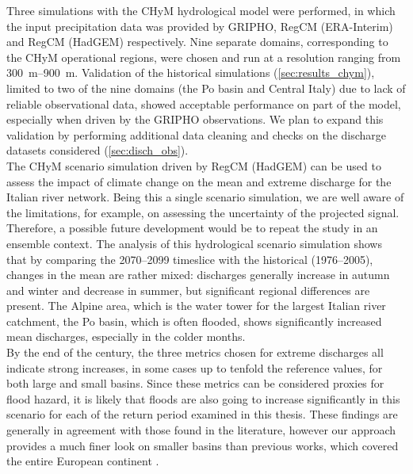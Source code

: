 Three simulations with the CHyM hydrological model were performed, in which the input precipitation data was provided by GRIPHO, RegCM (ERA-Interim) and RegCM (HadGEM) respectively.
Nine separate domains, corresponding to the CHyM operational regions, were chosen and run at a resolution ranging from \SIrange{300}{900}{\meter}.
Validation of the historical simulations (\cref{sec:results_chym}), limited to two of the nine domains (the Po basin and Central Italy) due to lack of reliable observational data, showed acceptable performance on part of the model, especially when driven by the GRIPHO observations.
We plan to expand this validation by performing additional data cleaning and checks on the discharge datasets considered (\cref{sec:disch_obs}).\\
The CHyM scenario simulation driven by RegCM (HadGEM) can be used to assess the impact of climate change on the mean and extreme discharge for the Italian river network.
Being this a single scenario simulation, we are well aware of the limitations, for example, on assessing the uncertainty of the projected signal.
Therefore, a possible future development would be to repeat the study in an ensemble context. 
The analysis of this hydrological scenario simulation shows that by comparing the 2070--2099 timeslice with the historical (1976--2005), changes in the mean are rather mixed: discharges generally increase in autumn and winter and decrease in summer, but significant regional differences are present.
The Alpine area, which is the water tower for the largest Italian river catchment, the Po basin, which is often flooded, shows significantly increased mean discharges, especially in the colder months.\\
By the end of the century, the three metrics chosen for extreme discharges all indicate strong increases, in some cases up to tenfold the reference values, for both large and small basins.
Since these metrics can be considered proxies for flood hazard, it is likely that floods are also going to increase significantly in this scenario for each of the return period examined in this thesis.
These findings are generally in agreement with those found in the literature, however our approach provides a much finer look on smaller basins than previous works, which covered the entire European continent \citep[see e.g.][]{Alfieri2015,Alfieri2015a}.

